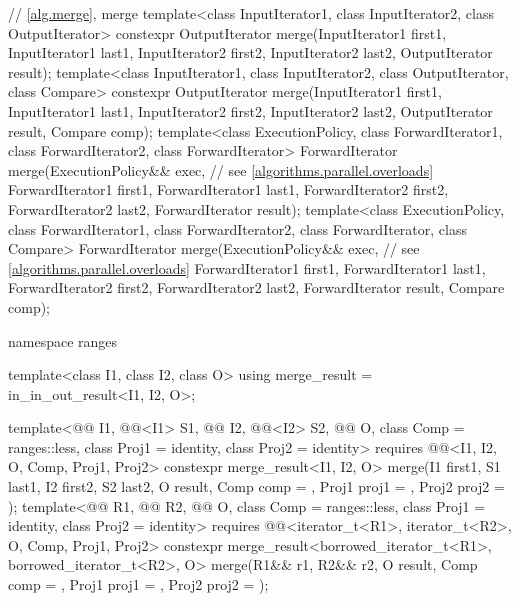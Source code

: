 \begin{codeblock}
{  // \ref{alg.merge}, merge
  template<class InputIterator1, class InputIterator2, class OutputIterator>
    constexpr OutputIterator
      merge(InputIterator1 first1, InputIterator1 last1,
            InputIterator2 first2, InputIterator2 last2,
            OutputIterator result);
  template<class InputIterator1, class InputIterator2, class OutputIterator,
           class Compare>
    constexpr OutputIterator
      merge(InputIterator1 first1, InputIterator1 last1,
            InputIterator2 first2, InputIterator2 last2,
            OutputIterator result, Compare comp);
  template<class ExecutionPolicy, class ForwardIterator1, class ForwardIterator2,
           class ForwardIterator>
    ForwardIterator
      merge(ExecutionPolicy&& exec,                             // see \ref{algorithms.parallel.overloads}
            ForwardIterator1 first1, ForwardIterator1 last1,
            ForwardIterator2 first2, ForwardIterator2 last2,
            ForwardIterator result);
  template<class ExecutionPolicy, class ForwardIterator1, class ForwardIterator2,
           class ForwardIterator, class Compare>
    ForwardIterator
      merge(ExecutionPolicy&& exec,                             // see \ref{algorithms.parallel.overloads}
            ForwardIterator1 first1, ForwardIterator1 last1,
            ForwardIterator2 first2, ForwardIterator2 last2,
            ForwardIterator result, Compare comp);

  namespace ranges {
    template<class I1, class I2, class O>
      using merge_result = in_in_out_result<I1, I2, O>;

    template<@@ I1, @@<I1> S1, @@ I2, @@<I2> S2,
             @@ O, class Comp = ranges::less, class Proj1 = identity,
             class Proj2 = identity>
      requires @@<I1, I2, O, Comp, Proj1, Proj2>
      constexpr merge_result<I1, I2, O>
        merge(I1 first1, S1 last1, I2 first2, S2 last2, O result,
              Comp comp = {}, Proj1 proj1 = {}, Proj2 proj2 = {});
    template<@@ R1, @@ R2, @@ O, class Comp = ranges::less,
             class Proj1 = identity, class Proj2 = identity>
      requires @@<iterator_t<R1>, iterator_t<R2>, O, Comp, Proj1, Proj2>
      constexpr merge_result<borrowed_iterator_t<R1>, borrowed_iterator_t<R2>, O>
        merge(R1&& r1, R2&& r2, O result,
              Comp comp = {}, Proj1 proj1 = {}, Proj2 proj2 = {});
  }

}
\end{codeblock}
